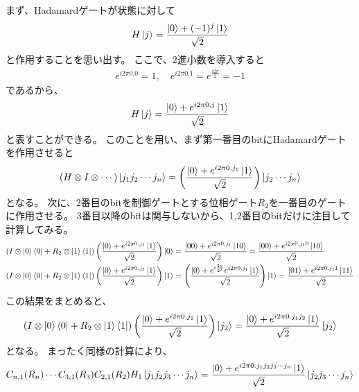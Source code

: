 \documentclass[]{ltjsarticle}
\begin{document}
まず、Hadamardゲートが状態に対して
\begin{align}
    H \ket{j} 
    = \frac{\ket{0} + (-1)^{j}\ket{1}}{\sqrt{2}}
\end{align}
と作用することを思い出す。
ここで、2進小数を導入すると
\begin{align}
    e^{i 2\pi 0.0} = 1, \quad 
    e^{i 2\pi 0.1} = e^{\frac{i 2\pi}{2}} = -1
\end{align}
であるから、
\begin{align}
    H \ket{j} 
    = \frac{\ket{0} + e^{i 2\pi 0.j}\ket{1}}{\sqrt{2}}
\end{align}
と表すことができる。
このことを用い、まず第一番目のbitにHadamardゲートを作用させると
\begin{align}
    (H \otimes I \otimes \cdots)\ket{j_1j_2\cdots j_n}
    =
    \left(
        \frac{\ket{0} + e^{i 2\pi 0.j_1}\ket{1}}{\sqrt{2}}
    \right)
    \ket{j_2\cdots j_n}
\end{align}
となる。
次に、2番目のbitを制御ゲートとする位相ゲート$R_2$を一番目のゲートに作用させる。
3番目以降のbitは関与しないから、1,2番目のbitだけに注目して計算してみる。
\begin{align}
    \left(
        I \otimes \ket{0}\bra{0}
        + 
        R_2 \otimes \ket{1}\bra{1}
    \right)
    \left(
        \frac{\ket{0} + e^{i 2\pi 0.j_1}\ket{1}}{\sqrt{2}}
    \right)
    \ket{0}
    &=
    \frac{\ket{00} + e^{i 2\pi 0.j_1}\ket{10}}{\sqrt{2}}
    =
    \frac{\ket{00} + e^{i 2\pi 0.j_10}\ket{10}}{\sqrt{2}} \\
    \left(
        I \otimes \ket{0}\bra{0}
        + 
        R_2 \otimes \ket{1}\bra{1}
    \right)
    \left(
        \frac{\ket{0} + e^{i 2\pi 0.j_1}\ket{1}}{\sqrt{2}}
    \right)
    \ket{1}
    &=
    \left(
        \frac{\ket{0} + e^{i\frac{2\pi}{2^2}}e^{i 2\pi 0.j_1}\ket{1}}{\sqrt{2}}
    \right)
    \ket{1}
    =
    \frac{\ket{01} + e^{i 2\pi 0.j_11}\ket{11}}{\sqrt{2}}
\end{align}
この結果をまとめると、
\begin{align}
    \left(
        I \otimes \ket{0}\bra{0}
        + 
        R_2 \otimes \ket{1}\bra{1}
    \right)
    \left(
        \frac{\ket{0} + e^{i 2\pi 0.j_1}\ket{1}}{\sqrt{2}}
    \right)
    \ket{j_2}
    =
    \frac{\ket{0} + e^{i 2\pi 0.j_1j_2}\ket{1}}{\sqrt{2}}
    \ket{j_2}
\end{align}
となる。
まったく同様の計算により、
\begin{align}
    C_{n,1}(R_n)
    \cdots
    C_{3,1}(R_3)
    C_{2,1}(R_2)
    H_1
    \ket{j_1j_2j_3\cdots j_n}
    =
    \frac{\ket{0} + e^{i 2\pi 0.j_1j_2j_3\cdots j_n}\ket{1}}{\sqrt{2}}
    \ket{j_2j_3\cdots j_n}
\end{align}
\end{document}
